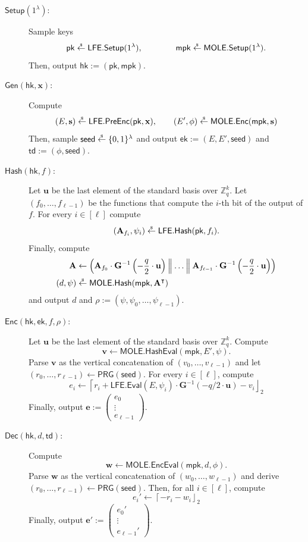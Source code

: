 \documentclass{article}
\newcommand{\ek}{\mathsf{ek}}
\newcommand{\td}{\mathsf{td}}
\newcommand{\LFE}{\mathsf{LFE}}
\newcommand{\MOLE}{\mathsf{MOLE}}
\newcommand{\getsr}{\overset{\raisebox{-1pt}{$\scriptscriptstyle \$$}}{\gets}}
\newcommand{\sample}{\getsr}
\newcommand{\Pre}{\mathsf{Pre}}
\newcommand{\Z}{\mathbb{Z}}
\renewcommand{\sec}{\ensuremath{\lambda}}
\newcommand{\secpar}{\sec}
\newcommand{\algofont}[1]{\ensuremath{\mathsf{#1}}}
\newcommand{\Enc}{{\algofont{Enc}}}
\newcommand{\Dec}{{\algofont{Dec}}}
\newcommand{\Setup}{{\algofont{Setup}}}
\newcommand{\Gen}{{\algofont{Gen}}}
\newcommand{\Eval}{\algofont{Eval}\xspace}
\newcommand{\Hash}{{\algofont{Hash}}}
\newcommand{\mpk}{\mathsf{mpk}}
\newcommand{\pk}{{\mathsf{pk}}}
\newcommand{\hk}{\ensuremath{\mathsf{hk}}}
\newcommand\bbbone{1}
\newenvironment{protocol}[1][]
{\begin{algorithm}\caption{#1}}
  {\end{algorithm}}
\begin{document}
\begin{protocol}[Reverse Trapdoor Hash]\label{prot:RTDH}
\setlength{\abovedisplayskip}{4pt}\setlength{\belowdisplayskip}{4pt}
\setlength{\belowdisplayshortskip}{4pt}


\begin{description}
\item[$\Setup(1^\secpar)$:] Sample keys
\[\pk \sample \LFE.\Setup(\bbbone^\sec), \qquad\qquad \mpk \sample \MOLE.\Setup(\bbbone^\sec).\]
Then, output $\hk:=(\pk, \mpk)$.

\item[$\Gen(\hk, \mathbf{x})$:] Compute
\[(E, \mathbf{s}) \sample \LFE.\Pre\Enc(\pk, \mathbf{x}), \qquad (E', \phi) \sample \MOLE.\Enc(\mpk, \mathbf{s})\]
{Then, sample $\mathsf{seed}\sample\{0, 1\}^\sec$ and output $\ek:=(E, E', \mathsf{seed})$ and $\td:=(\phi, \mathsf{seed})$.}



\item[$\Hash(\hk, f)$:] Let $\mathbf{u}$ be the last element of the standard basis over $\Z_q^k$. Let $(f_0, \dots, f_{\ell-1})$ be the functions that compute the $i$-th bit of the output of $f$. For every $i\in[\ell]$ compute
\[(\mathbf{A}_{f_i}, \psi_i)\sample\LFE.\Hash(\pk, f_i).\]
Finally, compute
\begin{align*}\mathbf{A}&\gets \left(\mathbf{A}_{f_0}\cdot \mathbf{G}^{-1}\left(-\frac{q}{2}\cdot \mathbf{u}\right)\mathbin{\Big\|}\dots \mathbin{\Big\|}\mathbf{A}_{f_{\ell-1}}\cdot \mathbf{G}^{-1}\left(-\frac{q}{2}\cdot \mathbf{u}\right)\right)\\
(d, \psi) &\sample \MOLE.\Hash(\mpk, \mathbf{A}^\intercal)\end{align*}
and output $d$ and $\rho:=(\psi, \psi_0, \dots, \psi_{\ell-1})$.


\item[$\Enc(\hk, \ek, f, \rho)$:] Let $\mathbf{u}$ be the last element of the standard basis over $\Z_q^k$. Compute
\[\mathbf{v}\gets \MOLE.\Hash\Eval(\mpk, E', \psi).\]
Parse $\mathbf{v}$ as the vertical concatenation of $(v_0, \dots, v_{\ell-1})$ 
and let $(r_0, \dots, r_{\ell-1})\gets \mathsf{PRG}(\mathsf{seed})$. For every $i\in[\ell]$, compute
\[e_i \gets \left\lceil r_i + \LFE.\Eval(E, \psi_i)\cdot  \mathbf{G}^{-1}(-q/2\cdot \mathbf{u}) - v_i \right\rfloor_2\]
Finally, output $\mathbf{e}:= \begin{pmatrix}
  e_0 \\ \vdots\\ e_{\ell-1}  
\end{pmatrix}$.
\item[$\Dec(\hk, d, \td)$:] Compute
\[\mathbf{w}\gets\MOLE.\Enc\Eval(\mpk, d, \phi).\]
 Parse $\mathbf{w}$ as the vertical concatenation of $(w_0, \dots, w_{\ell-1})$ 
and derive $(r_0, \dots, r_{\ell-1})\gets \mathsf{PRG}(\mathsf{seed})$. Then, for all $i\in[\ell]$, compute
\[e_i' \gets \left\lceil - r_i -w_i\right\rfloor_2\]
Finally, output $\mathbf{e}':=\begin{pmatrix}e_0'\\ \vdots\\ e_{\ell-1}'\end{pmatrix}$.
\end{description}
\end{protocol}
\end{document}
